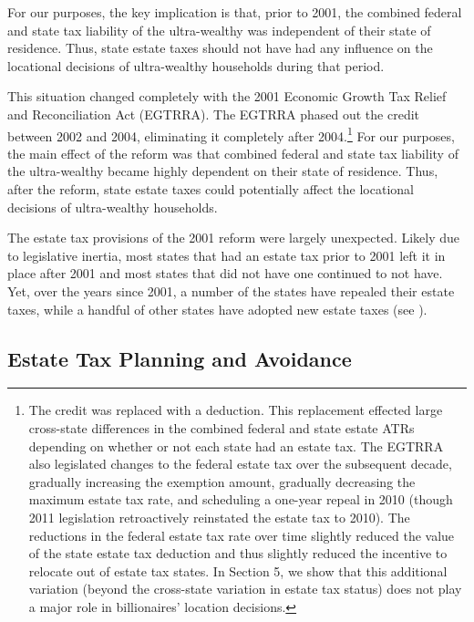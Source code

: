 \documentclass[12pt]{article}
\begin{document}
For our purposes, the key implication is that, prior to 2001, the combined federal and state  tax liability of the ultra-wealthy was independent of their state of residence. Thus, state estate taxes should not have had any influence on the locational decisions of ultra-wealthy households during that period.


This situation changed completely with the 2001 Economic Growth Tax Relief and Reconciliation Act (EGTRRA). The EGTRRA phased out the credit between 2002 and 2004, eliminating it completely after 2004.\footnote{The credit was replaced with a deduction. This replacement effected large cross-state differences in the combined federal and state estate ATRs depending on whether or not each state had an estate tax. The EGTRRA also legislated changes to the federal estate tax over the subsequent decade, gradually increasing the exemption amount, gradually decreasing the maximum estate tax rate, and scheduling a one-year repeal in 2010 (though 2011 legislation retroactively reinstated the estate tax to 2010). The reductions in the federal estate tax rate over time slightly reduced the value of the state estate tax deduction and thus slightly reduced the incentive to relocate out of estate tax states. In Section 5, we show that this additional variation (beyond the cross-state variation in estate tax status) does not play a major role in billionaires' location decisions.} 
For our purposes, the main effect of the reform was that combined federal and state tax liability of the ultra-wealthy became highly dependent on their state of residence. Thus, after the reform, state estate taxes could potentially affect the locational decisions of ultra-wealthy households. 

The estate tax provisions of the 2001 reform were largely unexpected. 
 Likely due to legislative inertia, most states that had an estate tax prior to 2001 left it in place after 2001 and most states that did not have one continued to not have. Yet, over the years since 2001, a number of the states have repealed their estate taxes, while a handful of other states have adopted new estate taxes (see \cite{michael2018survey}).



\subsection{Estate Tax Planning and Avoidance}
\label{section:EstateTaxAvoidance}
\end{document}
